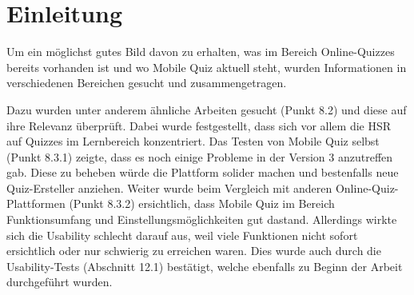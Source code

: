 






\section{Einleitung}

Um ein möglichst gutes Bild davon zu erhalten, was im Bereich Online-Quizzes bereits vorhanden ist und wo Mobile Quiz aktuell steht, wurden Informationen in verschiedenen Bereichen gesucht und zusammengetragen.

Dazu wurden unter anderem ähnliche Arbeiten gesucht (Punkt 8.2) und diese auf ihre Relevanz überprüft. Dabei wurde festgestellt, dass sich vor allem die HSR auf Quizzes im Lernbereich konzentriert.
Das Testen von Mobile Quiz selbst (Punkt 8.3.1) zeigte, dass es noch einige Probleme in der Version 3 anzutreffen gab. Diese zu beheben würde die Plattform solider machen und bestenfalls neue Quiz-Ersteller anziehen.
Weiter wurde beim Vergleich mit anderen Online-Quiz-Plattformen (Punkt 8.3.2) ersichtlich, dass Mobile Quiz im Bereich Funktionsumfang und Einstellungsmöglichkeiten gut dastand. Allerdings wirkte sich die Usability schlecht darauf aus, weil viele Funktionen nicht sofort ersichtlich oder nur schwierig zu erreichen waren. Dies wurde auch durch die Usability-Tests (Abschnitt 12.1) bestätigt, welche ebenfalls zu Beginn der Arbeit durchgeführt wurden.

